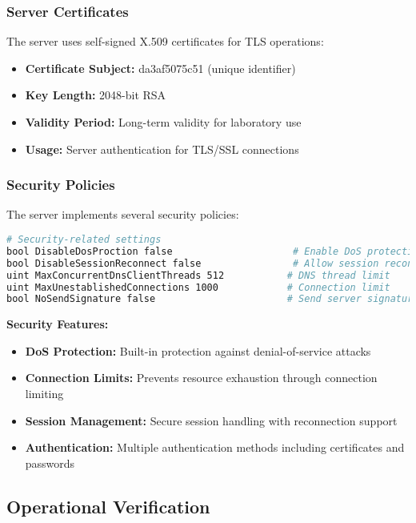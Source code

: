 \subsubsection{Server Certificates}

The server uses self-signed X.509 certificates for TLS operations:

\begin{itemize}
    \item \textbf{Certificate Subject:} da3af5075c51 (unique identifier)
    \item \textbf{Key Length:} 2048-bit RSA
    \item \textbf{Validity Period:} Long-term validity for laboratory use
    \item \textbf{Usage:} Server authentication for TLS/SSL connections
\end{itemize}

\subsubsection{Security Policies}

The server implements several security policies:

\begin{lstlisting}[language=bash]
# Security-related settings
bool DisableDosProction false                     # Enable DoS protection
bool DisableSessionReconnect false                # Allow session reconnection
uint MaxConcurrentDnsClientThreads 512           # DNS thread limit
uint MaxUnestablishedConnections 1000            # Connection limit
bool NoSendSignature false                       # Send server signature
\end{lstlisting}

\textbf{Security Features:}

\begin{itemize}
    \item \textbf{DoS Protection:} Built-in protection against denial-of-service attacks
    \item \textbf{Connection Limits:} Prevents resource exhaustion through connection limiting
    \item \textbf{Session Management:} Secure session handling with reconnection support
    \item \textbf{Authentication:} Multiple authentication methods including certificates and passwords
\end{itemize}

\subsection{Operational Verification}


